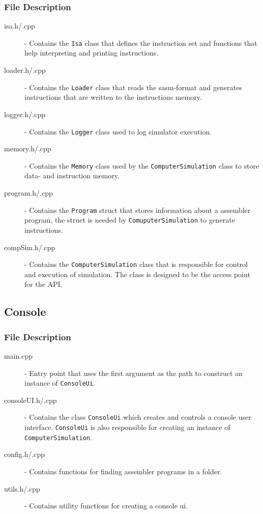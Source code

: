 \subsubsection{File Description}
\begin{description}
\item[isa.h/.cpp] - Contains the \texttt{Isa} class that defines the instruction set and functions that help interpreting and printing instructions.

\item[loader.h/.cpp] - Contains the \texttt{Loader} class that reads the sasm-format and generates instructions that are written to the instructions memory.

\item[logger.h/.cpp] - Contains the \texttt{Logger} class used to log simulator execution. 

\item[memory.h/.cpp] - Contains the \texttt{Memory} class used by the \texttt{ComputerSimulation} class to store data- and instruction memory. 

\item[program.h/.cpp] - Contains the \texttt{Program} struct that stores information about a assembler program, the struct is needed by \texttt{ComuputerSimulation} to generate instructions.

\item[compSim.h/.cpp] - Contains the \texttt{ComputerSimulation} class that is responsible for control and execution of simulation. The class is designed to be the access point for the API. 
\end{description}

\subsection{Console}
\subsubsection{File Description}
\begin{description}
\item[main.cpp] - Entry point that uses the first argument as the path to construct an instance of \texttt{ConsoleUi}. 

\item[consoleUI.h/.cpp] - Contains the class \texttt{ConsoleUi} which creates and controls a console user interface. \texttt{ConsoleUi} is also responsible for creating an instance of \texttt{ComputerSimulation}.
\item[config.h/.cpp] - Contains functions for finding assembler programs in a folder.
\item[utils.h/.cpp] - Contains utility functions for creating a console ui.
\end{description}

